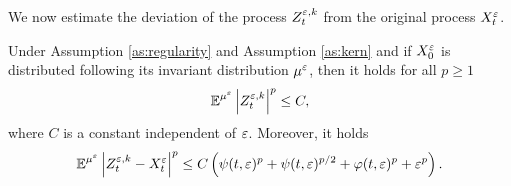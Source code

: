 \documentclass[10pt]{article}
\begin{document}
We now estimate the deviation of the process $Z_t^{\varepsilon, k}$ from the original process $X_t^\varepsilon$.
\begin{lemma}\label{lem:boundDiff} Under Assumption \ref{as:regularity} and Assumption \ref{as:kern} and if $X_0^\varepsilon$ is distributed following its invariant distribution $\mu^\varepsilon$, then it holds for all $p \geq 1$ 
	\begin{equation}\label{eq:boundDiff1}
		\operatorname{\mathbb{E}}^{\mu^\varepsilon} \left\lvert Z_t^{\varepsilon, k}\right\rvert^p \leq C,
	\end{equation}
	where $C$ is a constant independent of $\varepsilon$. Moreover, it holds
	\begin{equation}\label{eq:boundDiff2}
		\operatorname{\mathbb{E}}^{\mu^\varepsilon} \left\lvert Z_t^{\varepsilon, k} - X_t^\varepsilon\right\rvert^p \leq C\left(\psi(t, \varepsilon)^p + \psi(t, \varepsilon)^{p/2} + \varphi(t, \varepsilon)^p + \varepsilon^p \right).
	\end{equation}
\end{lemma}
\end{document}
